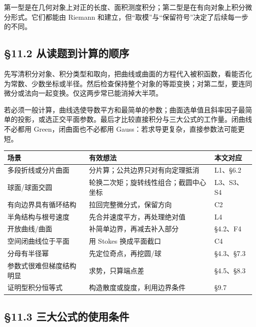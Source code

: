 \documentclass[11pt,a4paper]{article}
\begin{document}
第一型是在几何对象上对正的长度、面积测度积分；第二型是在有向对象上积分微分形式。它们都能由
Riemann 和建立，但``取模''与``保留符号''决定了后续每一步的不同。

\subsection{§11.2
从读题到计算的顺序}\label{ux4eceux8bfbux9898ux5230ux8ba1ux7b97ux7684ux987aux5e8f}

先写清积分对象、积分类型和取向，把曲线或曲面的方程代入被积函数，看能否化为常数、少数坐标或半径。然后检查保持整个对象的等距变换；对第二型，要连同微分或法向一起变换。仅这两步常已能消掉大半项。

若必须一般计算，曲线选使导数平方和最简单的参数；曲面选单值且斜率因子最简单的投影，或选正交平面参数。最后才比较直接积分与三大公式的工作量。闭曲线不必都用
Green，闭曲面也不必都用 Gauss：若求导更复杂，直接参数法可能更短。

\begin{longtable}[]{@{}lll@{}}
\toprule\noalign{}
场景 & 有效想法 & 本文对应 \\
\midrule\noalign{}
\endhead
\bottomrule\noalign{}
\endlastfoot
多段折线或分片曲面 & 分片算；公共边界只对有向定理抵消 & L1、§6.2 \\
球面/球面交圆 & 轮换二次矩；旋转线性组合；截圆中心坐标 & L3、S3、S4 \\
有向边界具有循环结构 & 拉回完整微分式，保留方向 & C2 \\
半角结构与根号速度 & 先合并速度平方，再处理绝对值 & L4 \\
开放曲线/曲面 & 补简单边界，再减去补入部分 & §4.2、F4 \\
空间闭曲线位于平面 & 用 Stokes 换成平面截口 & C4 \\
分母有半径幂 & 先定位奇点，再挖圆/球 & §4.3、§7.3 \\
参数式很难但梯度结构明显 & 求势，只算端点差 & §4.5、§8.3 \\
证明型积分恒等式 & 构造散度或旋度，利用边界条件 & §9.7 \\
\end{longtable}

\subsection{§11.3
三大公式的使用条件}\label{ux4e09ux5927ux516cux5f0fux7684ux4f7fux7528ux6761ux4ef6}
\end{document}
